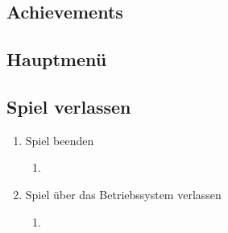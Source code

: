 \documentclass{scrartcl}
\begin{document}
\subsection{Achievements}

\subsection{Hauptmenü}

\subsection{Spiel verlassen}
	\begin{enumerate}
		\item Spiel beenden
			\begin{enumerate}
				\item 
			\end{enumerate}
		\item Spiel über das Betriebssystem verlassen
			\begin{enumerate}
				\item 
			\end{enumerate}
	\end{enumerate}
\end{document}
